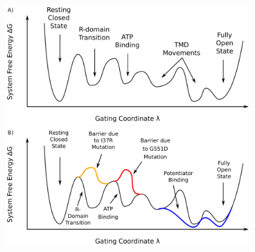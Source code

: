 	\begin{center}
		\begingroup
	\includegraphics[width=0.8\textwidth]{figures/perspective/drug_landscape_1.pdf}\\
	\includegraphics[width=0.8\textwidth]{figures/perspective/drug_landscape_3.pdf}\\
		\endgroup
	\end{center}
	\begingroup
	\captionsetup{singlelinecheck = false, justification=raggedright}
